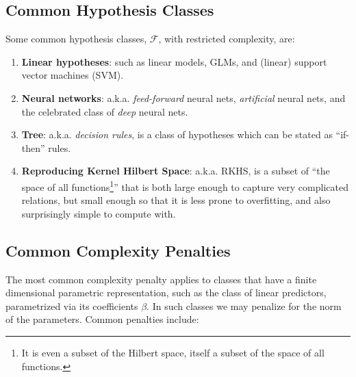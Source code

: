 \documentclass[]{book}
\theoremstyle{definition}
\theoremstyle{definition}
\theoremstyle{definition}
\theoremstyle{remark}
\begin{document}
\hypertarget{common-hypothesis-classes}{%
\subsection{Common Hypothesis Classes}\label{common-hypothesis-classes}}

Some common hypothesis classes, \(\mathcal{F}\), with restricted complexity, are:

\begin{enumerate}
\def\labelenumi{\arabic{enumi}.}
\item
  \textbf{Linear hypotheses}: such as linear models, GLMs, and (linear) support vector machines (SVM).
\item
  \textbf{Neural networks}: a.k.a. \emph{feed-forward} neural nets, \emph{artificial} neural nets, and the celebrated class of \emph{deep} neural nets.
\item
  \textbf{Tree}: a.k.a. \emph{decision rules}, is a class of hypotheses which can be stated as ``if-then'' rules.
\item
  \textbf{Reproducing Kernel Hilbert Space}: a.k.a. RKHS, is a subset of ``the space of all functions\footnote{It is even a subset of the Hilbert space, itself a subset of the space of all functions.}'' that is both large enough to capture very complicated relations, but small enough so that it is less prone to overfitting, and also surprisingly simple to compute with.
\end{enumerate}

\hypertarget{common-complexity-penalties}{%
\subsection{Common Complexity Penalties}\label{common-complexity-penalties}}

The most common complexity penalty applies to classes that have a finite dimensional parametric representation, such as the class of linear predictors, parametrized via its coefficients \(\beta\).
In such classes we may penalize for the norm of the parameters.
Common penalties include:
\end{document}
